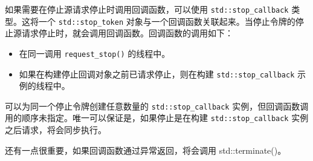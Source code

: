 如果需要在停止源请求停止时调用回调函数，可以使用 \verb|std::stop_callback| 类型。这将一个 \verb|std::stop_token| 对象与一个回调函数关联起来。当停止令牌的停止源请求停止时，就会调用回调函数。回调函数的调用如下：

\begin{itemize}
\item
在同一调用 \verb|request_stop()| 的线程中。

\item
如果在构建停止回调对象之前已请求停止，则在构建 \verb|std::stop_callback| 示例的线程中。
\end{itemize}

可以为同一个停止令牌创建任意数量的 \verb|std::stop_callback| 实例，但回调函数调用的顺序未指定。唯一可以保证是，如果停止是在构建 \verb|std::stop_callback| 实例之后请求，将会同步执行。

还有一点很重要，如果回调函数通过异常返回，将会调用 std::terminate()。


